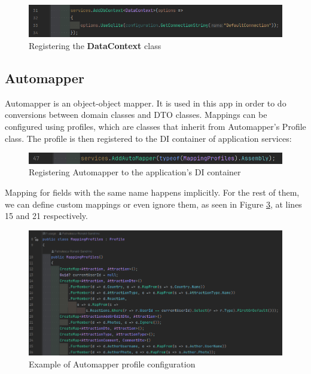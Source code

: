\begin{figure}[!ht]
    \centering
    \includegraphics[width=1\linewidth]{4.3.1_AddDbContext.png}
    \caption{Registering the \textbf{DataContext} class}
    \label{fig:enter-label}
\end{figure}


\subsection{Automapper}

\par Automapper is an object-object mapper. It is used in this app in order to do conversions between domain classes and DTO classes. Mappings can be configured using profiles, which are classes that inherit from Automapper's Profile class. The profile is then registered to the DI container of application services:

\begin{figure}[!ht]
    \centering
    \includegraphics[width=1\linewidth]{4.3.2_automapper-injection.png}
    \caption{Registering Automapper to the application's DI container}
    \label{fig:automapper-injection}
\end{figure}

\clearpage %

\par Mapping for fields with the same name happens implicitly. For the rest of them, we can define custom mappings or even ignore them, as seen in Figure \ref{fig:automapper-profile}, at lines 15 and 21 respectively.

\begin{figure}[!ht]
        \centering
        \includegraphics[width=1\linewidth]{4.3.2_automapper-profile.png}
        \caption{Example of Automapper profile configuration}
        \label{fig:automapper-profile}
\end{figure}

